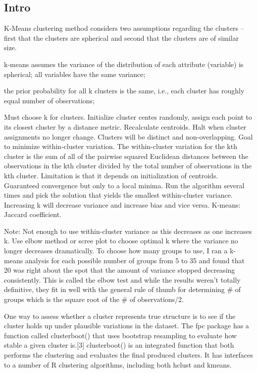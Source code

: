 \documentclass[]{book}
\theoremstyle{definition}
\theoremstyle{definition}
\theoremstyle{definition}
\theoremstyle{remark}
\begin{document}
\subsection{Intro}\label{intro-5}

K-Means clustering method considers two assumptions regarding the
clusters -- first that the clusters are spherical and second that the
clusters are of similar size.

k-means assumes the variance of the distribution of each attribute
(variable) is spherical; all variables have the same variance;

the prior probability for all k clusters is the same, i.e., each cluster
has roughly equal number of observations;

Must choose k for clusters. Initialize cluster centes randomly, assign
each point to its closest cluster by a distance metric. Recalculate
centroids. Halt when cluster assignments no longer change. Clusters will
be distinct and non-overlapping. Goal to minimize within-cluster
variation. The within-cluster variation for the kth cluster is the sum
of all of the pairwise squared Euclidean distances between the
observations in the kth cluster divided by the total number of
observations in the kth cluster. Limitation is that it depends on
initialization of centroids. Guaranteed convergence but only to a local
minima. Run the algorithm several times and pick the solution that
yields the smallest within-cluster variance. Increasing k will decrease
variance and increase bias and vice versa. K-means: Jaccard coefficient.

Note: Not enough to use within-cluster variance as this decreases as one
increases k. Use elbow method or scree plot to choose optimal k where
the variance no longer decreases dramatically. To choose how many groups
to use, I ran a k-means analysis for each possible number of groups from
5 to 35 and found that 20 was right about the spot that the amount of
variance stopped decreasing consistently. This is called the elbow test
and while the results weren't totally definitive, they fit in well with
the general rule of thumb for determining \# of groups which is the
square root of the \# of observations/2.

One way to assess whether a cluster represents true structure is to see
if the cluster holds up under plausible variations in the dataset. The
fpc package has a function called clusterboot() that uses bootstrap
resampling to evaluate how stable a given cluster is.{[}3{]}
clusterboot() is an integrated function that both performs the
clustering and evaluates the final produced clusters. It has interfaces
to a number of R clustering algorithms, including both hclust and
kmeans.
\end{document}
